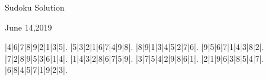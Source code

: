 \documentclass{article}
\begin{document}
\begin{center}
\Huge{Sudoku Solution}
\end{center}
\begin{center}
\Large{June 14,2019}
\end{center}
\begin{sudoku}
|4|6|7|8|9|2|1|3|5|.
|5|3|2|1|6|7|4|9|8|.
|8|9|1|3|4|5|2|7|6|.
|9|5|6|7|1|4|3|8|2|.
|7|2|8|9|5|3|6|1|4|.
|1|4|3|2|8|6|7|5|9|.
|3|7|5|4|2|9|8|6|1|.
|2|1|9|6|3|8|5|4|7|.
|6|8|4|5|7|1|9|2|3|.
\end{sudoku}
\end{document}
